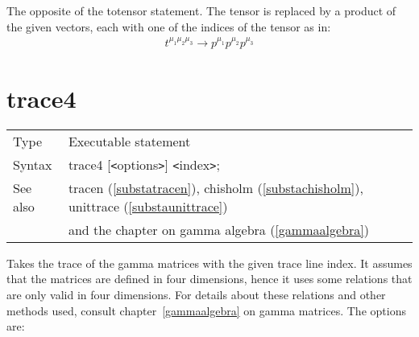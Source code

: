 \noindent The opposite of the totensor 
statement. The tensor is replaced by a product of the given vectors, each 
with one of the indices of the tensor as in:
\begin{eqnarray}
    t^{\mu_1\mu_2\mu_3} \rightarrow p^{\mu_1}p^{\mu_2}p^{\mu_3} \nonumber
\end{eqnarray}\vspace{10mm}
\setcounter{equation}{7}


\section{trace4}
\label{substatrace}

\noindent \begin{tabular}{ll}
Type & Executable statement\\
Syntax & trace4 [{\tt<}options{\tt>}] {\tt<}index{\tt>}; \\
See also & tracen (\ref{substatracen}), chisholm (\ref{substachisholm}),
    unittrace (\ref{substaunittrace}) \\ &
    and the chapter on gamma algebra (\ref{gammaalgebra})
\end{tabular} \vspace{4mm}

\noindent Takes the trace of the gamma 
matrices with the given trace line 
index. It assumes that the matrices are 
defined in four dimensions, hence it uses some relations that are only 
valid in four dimensions. For details about these relations and other 
methods used, consult chapter~\ref{gammaalgebra} on gamma matrices. The 
options are: \vspace{4mm}





